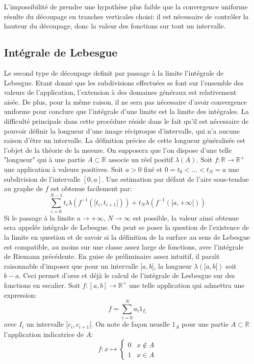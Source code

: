 L'impossibilité de prendre une hypothèse plus faible que la convergence uniforme
résulte du découpage en tranches verticales choisi: il est nécessaire de
contrôler la hauteur du découpage, donc la valeur des fonctions sur tout un
intervalle. 

\subsection{Intégrale de Lebesgue}
Le second type de découpage definit par passage à la limite l'intégrale de
Lebesgue. Etant donné que les subdivisions effectuées se font sur l'ensemble des
valeurs de l'application, l'extension à des domaines généraux est relativement
aisée. De plus, pour la même raison, il ne sera pas nécessaire d'avoir
convergence uniforme pour conclure que l'intégrale d'une limite est la limite
des intégrales. La difficulté principale dans cette procédure réside dans le
fait qu'il est nécessaire de pouvoir définir la longueur d'une image réciproque
d'intervalle, qui n'a aucune raison d'être un intervalle. La définition précise
de cette longueur généralisée est l'objet de la théorie de la mesure. On
supposera que l'on dispose d'une telle "longueur" qui à une partie $A \subset
\mathbb{R}$ associe un réel positif $\lambda(A)$. Soit $f\colon \mathbb{R}\to
 \mathbb{R}^+$ une application à valeurs positives. Soit $a>0$ fixé et $0=t_0 <
\dots < t_N = a$ une subdivision de l'intervalle $[0,a]$. Une estimation par
défaut de l'aire sous-tendue au graphe de $f$ est obtenue facilement par:
\[
\sum_{i=0}^{N-1} t_{i} \lambda(f^{-1}([t_i, t_{i+1}[)) + t_N
\lambda(f^{-1}([a, +\infty[))
\]
Si le  passage à la limite $a \to +\infty$, $N \to \infty$ est possible, la
valeur ainsi obtenue sera appelée intégrale de Lebesgue. On peut se poser la
question de l'existence de la limite en question et de savoir si la définition 
de la surface au sens de Lebesgue est compatible, au
moins sur une classe assez large de fonctions, avec l'intégrale de Riemann
précédente. 
En guise de préliminaire assez intuitif, il para\^{\i}t raisonnable d'imposer
que pour un intervalle $[a,b[$, la longueur $\lambda([a,b[)$ soit $b-a$. Ceci
permet d'ores et déjà le calcul de l'intégrale de Lesbesgue sur des fonctions en
escalier. Soit $f \colon [a,b] \to \mathbb{R}^+$ une telle application qui
admettra une expression:
\[
f = \sum_{i=0}^N a_i 1_{I_i}
\]
avec $I_i$ un intervalle $[c_i, c_{i+1}[$.
On note de façon usuelle $1_A$ pour une partie $A \subset \mathbb{R}$
l'application indicatrice de $A$:
\[
f \colon x \mapsto \left \{
\begin{array}{cc}
0 & x \notin A \\
1 & x \in A
\end{array} 
\right.
\]

